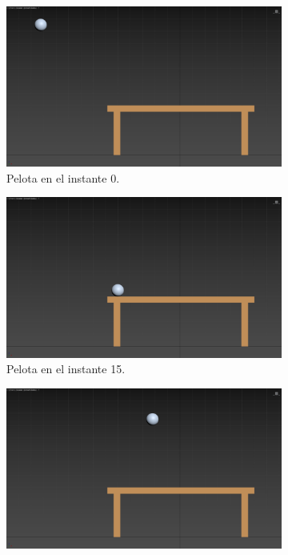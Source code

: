 \documentclass{article}
\begin{document}
\begin{figure}[H]
    \centering
    \begin{subfigure}[H]{0.48\textwidth}
        \centering
        \includegraphics[width=\textwidth]{imagenes/Ejercicio3/keyframes/0.png}
        \caption{Pelota en el instante 0.}
    \end{subfigure}
    \hfill
    \begin{subfigure}[H]{0.48\textwidth}
        \centering
        \includegraphics[width=\textwidth]{imagenes/Ejercicio3/keyframes/15.png}
        \caption{Pelota en el instante 15.}
    \end{subfigure}
    \par\bigskip
    \begin{subfigure}[H]{0.48\textwidth}
        \centering
        \includegraphics[width=\textwidth]{imagenes/Ejercicio3/keyframes/25.png}

\end{subfigure}
\end{figure}
\end{document}

